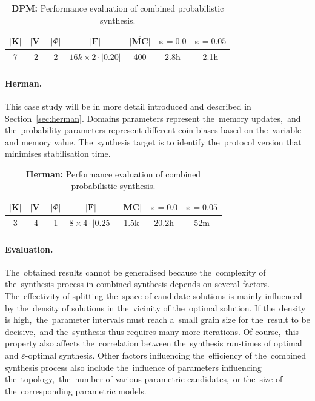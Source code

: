 \begin{table}[h!]
\centering
\begin{tabular}{|c|c|c|c|c|c|c|}
\hline
$\lvert \mathbf{K} \rvert$ & $\lvert \mathbf{V} \rvert$ & $\lvert \varPhi \rvert$ & $\lvert \mathcal{\mathbf{F}} \rvert$ & $\overline{\mathbf{\lvert MC \rvert}}$ & $\mathbf{\varepsilon = 0.0}$ & $\mathbf{\varepsilon = 0.05}$ \\ \hline
7 & 2 & 2 & $16k \times 2 \cdot \lvert 0.20 \rvert$ & 400 & 2.8h & 2.1h \\ \hline
\end{tabular}
\caption{\textbf{DPM:} Performance evaluation of combined probabilistic synthesis.}
\end{table}

\vspace*{-0.4cm}
\paragraph{Herman.}
This case study will be in more detail introduced and described in Section~\ref{sec:herman}.
Domains parameters represent the~memory updates,~and the~probability parameters represent different coin biases based on the~variable and memory value.
The~synthesis target is to identify the~protocol version that minimises stabilisation time.

\begin{table}[h!]
\centering
\begin{tabular}{|c|c|c|c|c|c|c|}
\hline
$\lvert \mathbf{K} \rvert$ & $\lvert \mathbf{V} \rvert$ & $\lvert \varPhi \rvert$ & $\lvert \mathcal{\mathbf{F}} \rvert$ & $\overline{\mathbf{\lvert MC \rvert}}$ & $\mathbf{\varepsilon = 0.0}$ & $\mathbf{\varepsilon = 0.05}$ \\ \hline
3 & 4 & 1 & $8 \times 4 \cdot \lvert 0.25 \rvert$ & 1.5k & 20.2h & 52m \\ \hline
\end{tabular}
\caption{\textbf{Herman:} Performance evaluation of combined probabilistic synthesis.}
\end{table}

\vspace*{-0.4cm}
\paragraph{Evaluation.}
The~obtained results cannot be generalised because the~complexity of the~synthesis process in combined synthesis depends on several factors. 
The~effectivity of splitting the~space of candidate solutions is mainly influenced by the~density of solutions in the~vicinity of the~optimal solution.
If the~density is high,~the~parameter intervals must reach a~small grain size for the~result to be decisive,~and the~synthesis thus requires many more iterations.
Of course,~this property also affects the~correlation between the~synthesis run-times of optimal and $\varepsilon$-optimal synthesis.
Other factors influencing the~efficiency of the~combined synthesis process also include the~influence of parameters influencing the~topology,~the~number of various parametric candidates,~or the~size of the~corresponding parametric models.

